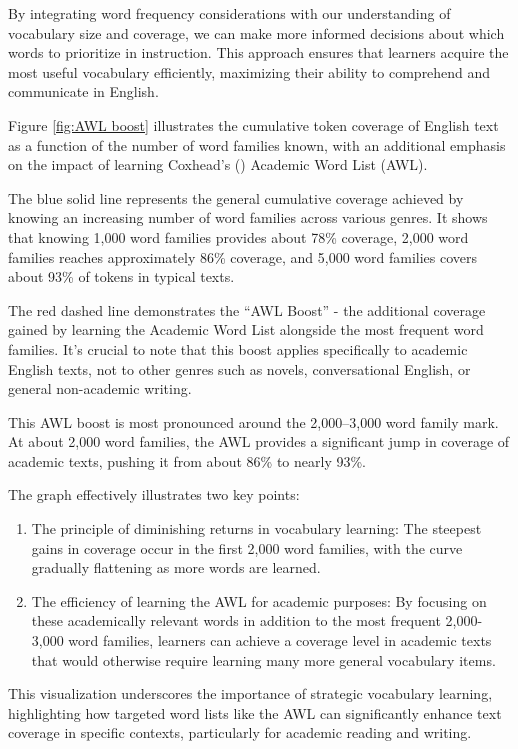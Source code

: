 By integrating word frequency considerations with our understanding of vocabulary size and coverage, we can make more informed decisions about which words to prioritize in instruction. This approach ensures that learners acquire the most useful vocabulary efficiently, maximizing their ability to comprehend and communicate in English.

Figure \ref{fig:AWL boost} illustrates the cumulative token coverage of English text as a function of the number of word families known, with an additional emphasis on the impact of learning Coxhead's (\citeyear{coxhead2000academic}) Academic Word List (AWL).

The blue solid line represents the general cumulative coverage achieved by knowing an increasing number of word families across various genres. It shows that knowing 1,000 word families provides about 78\% coverage, 2,000 word families reaches approximately 86\% coverage, and 5,000 word families covers about 93\% of tokens in typical texts.

The red dashed line demonstrates the ``AWL Boost'' - the additional coverage gained by learning the Academic Word List alongside the most frequent word families. It's crucial to note that this boost applies specifically to academic English texts, not to other genres such as novels, conversational English, or general non-academic writing.

This AWL boost is most pronounced around the 2,000--3,000 word family mark. At about 2,000 word families, the AWL provides a significant jump in coverage of academic texts, pushing it from about 86\% to nearly 93\%.

The graph effectively illustrates two key points:

\begin{enumerate}
    \item The principle of diminishing returns in vocabulary learning: The steepest gains in coverage occur in the first 2,000 word families, with the curve gradually flattening as more words are learned.
    \item The efficiency of learning the AWL for academic purposes: By focusing on these academically relevant words in addition to the most frequent 2,000-3,000 word families, learners can achieve a coverage level in academic texts that would otherwise require learning many more general vocabulary items.
\end{enumerate}

This visualization underscores the importance of strategic vocabulary learning, highlighting how targeted word lists like the AWL can significantly enhance text coverage in specific contexts, particularly for academic reading and writing.

